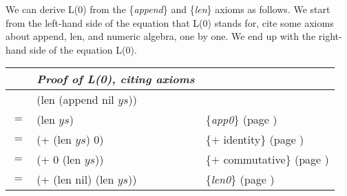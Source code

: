 
We can derive L(0) from the \{\emph{append}\} and \{\emph{len}\} axioms as follows.
We start from the left-hand side of the equation that L(0) stands for,
cite some axioms about \textsf{append}, \textsf{len}, and numeric algebra,
one by one. We end up with the right-hand side of the equation L(0).
\begin{center}
\begin{tabular}{lll}
&\emph{Proof of L(0), citing axioms}&\\
\hline
    & \textsf{(len (append nil $ys$))}  &                                                \\
$=$ & \textsf{(len $ys$)}               & \{\emph{app0}\}     (page \pageref{append-equations})\\
$=$ & \textsf{(+ (len $ys$) 0)}         & \{$+$ identity\}    (page \pageref{fig-02-01}) \\
$=$ & \textsf{(+ 0 (len $ys$))}         & \{$+$ commutative\} (page \pageref{fig-02-01}) \\
$=$ & \textsf{(+ (len nil) (len $ys$))} & \{\emph{len0}\}     (page \pageref{len-equations})
\end{tabular}
\end{center}


